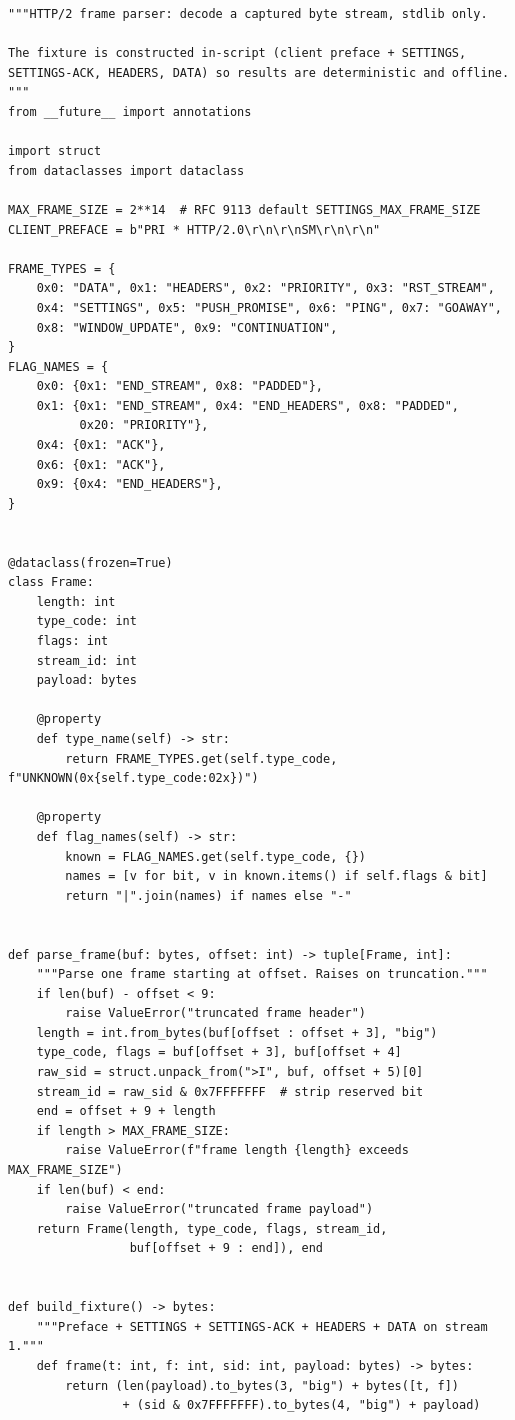 \begin{verbatim}
"""HTTP/2 frame parser: decode a captured byte stream, stdlib only.

The fixture is constructed in-script (client preface + SETTINGS,
SETTINGS-ACK, HEADERS, DATA) so results are deterministic and offline.
"""
from __future__ import annotations

import struct
from dataclasses import dataclass

MAX_FRAME_SIZE = 2**14  # RFC 9113 default SETTINGS_MAX_FRAME_SIZE
CLIENT_PREFACE = b"PRI * HTTP/2.0\r\n\r\nSM\r\n\r\n"

FRAME_TYPES = {
    0x0: "DATA", 0x1: "HEADERS", 0x2: "PRIORITY", 0x3: "RST_STREAM",
    0x4: "SETTINGS", 0x5: "PUSH_PROMISE", 0x6: "PING", 0x7: "GOAWAY",
    0x8: "WINDOW_UPDATE", 0x9: "CONTINUATION",
}
FLAG_NAMES = {
    0x0: {0x1: "END_STREAM", 0x8: "PADDED"},
    0x1: {0x1: "END_STREAM", 0x4: "END_HEADERS", 0x8: "PADDED",
          0x20: "PRIORITY"},
    0x4: {0x1: "ACK"},
    0x6: {0x1: "ACK"},
    0x9: {0x4: "END_HEADERS"},
}


@dataclass(frozen=True)
class Frame:
    length: int
    type_code: int
    flags: int
    stream_id: int
    payload: bytes

    @property
    def type_name(self) -> str:
        return FRAME_TYPES.get(self.type_code, f"UNKNOWN(0x{self.type_code:02x})")

    @property
    def flag_names(self) -> str:
        known = FLAG_NAMES.get(self.type_code, {})
        names = [v for bit, v in known.items() if self.flags & bit]
        return "|".join(names) if names else "-"


def parse_frame(buf: bytes, offset: int) -> tuple[Frame, int]:
    """Parse one frame starting at offset. Raises on truncation."""
    if len(buf) - offset < 9:
        raise ValueError("truncated frame header")
    length = int.from_bytes(buf[offset : offset + 3], "big")
    type_code, flags = buf[offset + 3], buf[offset + 4]
    raw_sid = struct.unpack_from(">I", buf, offset + 5)[0]
    stream_id = raw_sid & 0x7FFFFFFF  # strip reserved bit
    end = offset + 9 + length
    if length > MAX_FRAME_SIZE:
        raise ValueError(f"frame length {length} exceeds MAX_FRAME_SIZE")
    if len(buf) < end:
        raise ValueError("truncated frame payload")
    return Frame(length, type_code, flags, stream_id,
                 buf[offset + 9 : end]), end


def build_fixture() -> bytes:
    """Preface + SETTINGS + SETTINGS-ACK + HEADERS + DATA on stream 1."""
    def frame(t: int, f: int, sid: int, payload: bytes) -> bytes:
        return (len(payload).to_bytes(3, "big") + bytes([t, f])
                + (sid & 0x7FFFFFFF).to_bytes(4, "big") + payload)


\end{verbatim}
